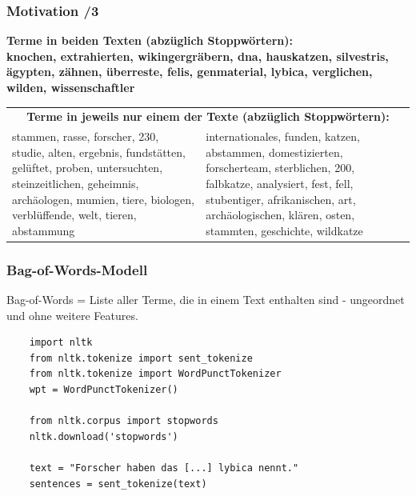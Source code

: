     \begin{frame}
    \frametitle{Motivation /3}
    \begin{center}
    \scriptsize{\textbf{Terme in beiden Texten (abzüglich Stoppwörtern):\\knochen, extrahierten, wikingergräbern, dna, hauskatzen, silvestris, ägypten, zähnen, überreste, felis, genmaterial, lybica, verglichen, wilden, wissenschaftler}}
    \end{center}
    
    \begin{table}[htp]
    \begin{center}
    \begin{tabular}{p{5cm}p{5cm}}
    \multicolumn{2}{c}{\scriptsize{\textbf{Terme in jeweils nur einem der Texte (abzüglich Stoppwörtern):}}}\\
    \scriptsize{stammen, rasse, forscher, 230, studie, alten, ergebnis, fundstätten, gelüftet, proben, untersuchten, steinzeitlichen, geheimnis, archäologen, mumien, tiere, biologen, verblüffende, welt, tieren, abstammung} & \scriptsize{internationales, funden, katzen, abstammen, domestizierten, forscherteam, sterblichen, 200, falbkatze, analysiert, fest, fell, stubentiger, afrikanischen, art, archäologischen, klären, osten, stammten, geschichte, wildkatze} \\
    \end{tabular}
    \end{center}
    \end{table}%
    
\end{frame}
    

\begin{frame}[fragile]
    \frametitle{Bag-of-Words-Modell}

    Bag-of-Words = Liste aller Terme, die in einem Text enthalten sind - ungeordnet und ohne weitere Features.

    \begin{verbatim}
    import nltk
    from nltk.tokenize import sent_tokenize
    from nltk.tokenize import WordPunctTokenizer
    wpt = WordPunctTokenizer()

    from nltk.corpus import stopwords
    nltk.download('stopwords')

    text = "Forscher haben das [...] lybica nennt."
    sentences = sent_tokenize(text)
    \end{verbatim}
\end{frame}

